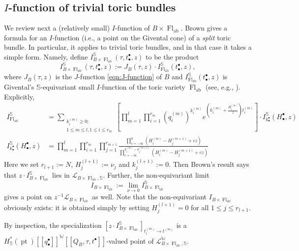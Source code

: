 \documentclass[a4paper,12pt]{amsart}
\numberwithin{equation}{section}
\theoremstyle{definition}
\newcommand{\bbS}{\mathbb{S}}
\newcommand{\W}{\mathbb{W}}
\newcommand{\cL}{\mathcal{L}}
\newcommand{\pt}{\operatorname{pt}}
\newcommand{\FlT}{\operatorname{Fl}_{\operatorname{ab}}}
\begin{document}
\subsection{$I$-function of trivial toric bundles}\label{subsec:Brown}
We review next a (relatively small) $I$-function of $B\times\FlT$.
Brown \cite{Brown} gives a formula for an $I$-function (i.e., a point on the Givental cone) of a \emph{split} toric bundle.
In particular, it applies to trivial toric bundles, and in that case it takes a simple form. 
Namely, define $I^\bbS_{B\times\FlT}(\tau,t_\bullet^\bullet,z)$ to be the product 
\begin{equation}\label{eqn:brown_function}
I^\bbS_{B\times\FlT}(\tau,t_\bullet^\bullet,z):=J_B(\tau,z)\cdot I_{\FlT}^\bbS(t_\bullet^\bullet,z),
\end{equation}
where $J_B(\tau,z)$ is the $J$-function \eqref{eqn:J-function} of $B$ and $I_{\FlT}^\bbS(t_\bullet^\bullet,z)$ is Givental's $\bbS$-equivariant small $I$-function of the toric variety $\FlT$ (see, e.g., \cite{Givental:mirror}). 
Explicitly,
\begin{align*}
    I_{\FlT}^\bbS &= \sum_{ \substack{k_i^{(m)}\geq0; \\1\leq m\leq l, 1\leq i\leq r_m} } \left[ \prod_{m=1}^l\prod_{i=1}^{r_m}(q_i^{(m)})^{k_i^{(m)}}e^{\left(k_i^{(m)}+\frac{H_i^{(m)}}{z}\right)t_i^{(m)}} \right] \cdot I_{k_\bullet^\bullet}^\bbS(H_\bullet^\bullet,z)  \\
    I_{k_\bullet^\bullet}^\bbS(H_\bullet^\bullet,z) &= \prod_{m=1}^{l}\prod_{i=1}^{r_m}\prod_{j=1}^{r_{m+1}}\frac{\prod_{c=-\infty}^{0}(H_i^{(m)}-H_j^{(m+1)}+cz)}{\prod_{c=-\infty}^{k_i^{(m)}-k_j^{(m+1)}}(H_i^{(m)}-H_j^{(m+1)}+cz)}
\end{align*}
Here we set $r_{l+1}:=N$, $H_j^{(l+1)}:=\nu_j$ and $k_j^{(l+1)}:=0$.
Then Brown's result says that $z\cdot I_{B\times\FlT}^\bbS$ lies in $\cL_{B\times\FlT,\bbS}$.
Further, the non-equivariant limit 
\begin{equation}
I_{B\times\FlT} := \lim_{\nu\to0} I^\bbS_{B\times\FlT}
\end{equation}
gives a point on $z^{-1}\cL_{B\times\FlT}$ as well. Note that the non-equivariant $I_{B\times\FlT}$ obviously exists: it is obtained simply by setting $H_j^{(l+1)}=0$ for all $1\leq j\leq r_{l+1}$.

By inspection, the specialization $[z\cdot I_{B\times\FlT}^\bbS]_{t_i^{(m)}\to t^{(m)}}$ is a $H^*_\bbS(\pt)[\![q_\bullet^\bullet]\!]^\W[\![Q_B,\tau,t^\bullet]\!]$-valued point of $\cL_{B\times\FlT,\bbS}^\W$.
\end{document}
